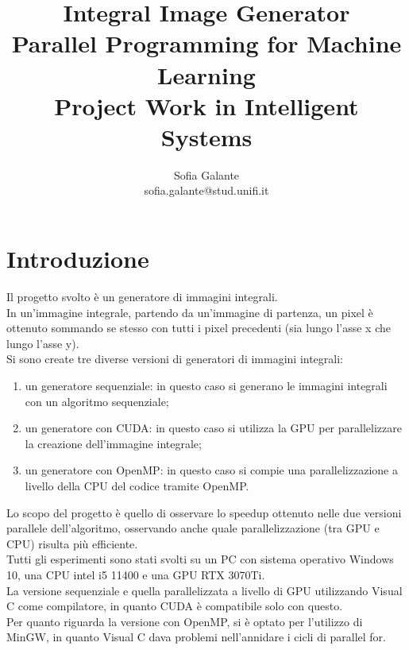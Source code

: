 \documentclass[10pt,twocolumn,letterpaper]{article}
\begin{document}
\title{Integral Image Generator\\
\large Parallel Programming for Machine Learning\\Project Work in Intelligent Systems}

\author{Sofia Galante\\
\small sofia.galante@stud.unifi.it\\
}
\date{}
\maketitle
\thispagestyle{empty}

\section{Introduzione}

Il progetto svolto è un generatore di immagini integrali.\\
In un’immagine integrale, partendo da un’immagine di partenza, un pixel è ottenuto sommando se stesso con tutti i pixel precedenti (sia lungo l’asse x che lungo l’asse y).\\
Si sono create tre diverse versioni di generatori di immagini integrali:
\begin{enumerate}
\item{un generatore sequenziale: in questo caso si generano le immagini integrali con un algoritmo sequenziale;}
\item{un generatore con CUDA: in questo caso si utilizza la GPU per parallelizzare la creazione dell’immagine integrale;}
\item{un generatore con OpenMP: in questo caso si compie una parallelizzazione a livello della CPU del codice tramite OpenMP.}
\end{enumerate}
Lo scopo del progetto è quello di osservare lo speedup ottenuto nelle due versioni parallele dell’algoritmo, osservando anche quale parallelizzazione (tra GPU e CPU) risulta più efficiente.\\
Tutti gli esperimenti sono stati svolti su un PC con sistema operativo Windows 10, una CPU intel i5 11400 e una GPU RTX 3070Ti.\\
La versione sequenziale e quella parallelizzata a livello di GPU utilizzando Visual C come compilatore, in quanto CUDA è compatibile solo con questo.\\
Per quanto riguarda la versione con OpenMP, si è optato per l’utilizzo di MinGW, in quanto Visual C dava problemi nell’annidare i cicli di parallel for.
\end{document}
